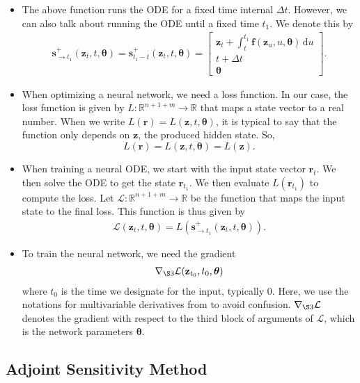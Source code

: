 \documentclass[10pt]{article}
\newcommand{\dee}{\mathrm{d}}
\newcommand{\ve}[1]{\mathbf{#1}}
\newcommand{\ves}[1]{\boldsymbol{#1}}
\newcommand{\mcal}[1]{\mathcal{#1}}
\newcommand{\Real}{\mathbb{R}}
\begin{document}
\begin{itemize}
  \item The above function runs the ODE for a fixed time internal $\Delta t$. However, we can also talk about running the ODE until a fixed time $t_1$. We denote this by
  \begin{align*}
    \ve{s}^+_{\rightarrow t_1}(\ve{z}_t, t, \ves{\theta}) 
    = \ve{s}^+_{t_1 - t}(\ve{z}_t, t, \ves{\theta})
    = \begin{bmatrix}
      \ve{z}_t + \int_{t}^{t_1} \ve{f}(\ve{z}_u, u, \ves{\theta})\, \dee u \\
      t + \Delta t \\
      \ves{\theta}
    \end{bmatrix}.
  \end{align*}

  \item When optimizing a neural network, we need a loss function. In our case, the loss function is given by $L: \Real^{n+1+m} \rightarrow \Real$ that maps a state vector to a real number. When we write $L(\ve{r}) = L(\ve{z}, t, \ves{\theta})$, it is typical to say that the function only depends on $\ve{z}$, the produced hidden state. So, $$L(\ve{r}) = L(\ve{z},t,\ves{\theta}) = L(\ve{z}).$$ 
  
  \item When training a neural ODE, we start with the input state vector $\ve{r}_{t}$. We then solve the ODE to get the state $\ve{r}_{t_1}$. We then evaluate $L(\ve{r}_{t_1})$ to compute the loss. Let $\mcal{L}: \Real^{n+1+m} \rightarrow \Real$ be the function that maps the input state to the final loss. This function is thus given by
  \begin{align*}
    \mcal{L}(\ve{z}_t, t, \ves{\theta}) = L(\ve{s}^+_{\rightarrow t_1}(\ve{z}_t, t, \ves{\theta})).
  \end{align*}

  \item To train the neural network, we need the gradient
  \begin{align*}
    \nabla_{\S3} \mcal{L}(\ve{z}_{t_0}, t_0, \ves{\theta})
  \end{align*}
  where $t_0$ is the time we designate for the input, typically $0$. Here, we use the notations for multivariable derivatives from \cite{KhungurnDeriv} to avoid confusion. $\nabla_{\S3}\mcal{L}$ denotes the gradient with respect to the third block of arguments of $\mcal{L}$, which is the network parameters $\ves{\theta}$.  
\end{itemize}

\subsection{Adjoint Sensitivity Method}
\end{document}
